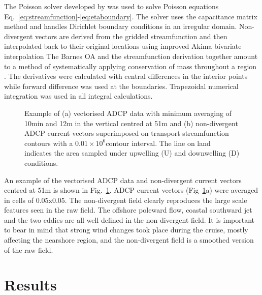 The Poisson solver developed by \citet{Cummins94} was used to
solve Poisson equations
Eq.~\ref{eq:streamfunction}-\ref{eq:etaboundary}. The solver uses
the capacitance matrix method and handles Dirichlet boundary
conditions in an irregular domain. Non-divergent vectors are
derived from the gridded streamfunction and then interpolated back
to their original locations using improved Akima bivariate
interpolation \citep{Akima96} The Barnes OA and the streamfunction
derivation together amount to a method of systematically applying
conservation of mass throughout a region \citep{Pierce00}. The
derivatives were calculated with central differences in the
interior points while forward difference was used at the
boundaries. Trapezoidal numerical integration was used in all
integral calculations.

\begin{figure}[!ht]
\centering {}  \caption{Example of
(a) vectorised ADCP data with minimum averaging of 10min and 12m
in the vertical centred at 51m and (b) non-divergent ADCP current
vectors superimposed on transport streamfunction contours with a
$0.01\times 10^{6}$\tra contour interval. The line on land
indicates the area sampled under upwelling (U) and downwelling (D)
conditions.} \label{fig:cd105_stream}\end{figure}

An example of the vectorised ADCP data and non-divergent current
vectors centred at 51m is shown in Fig.~\ref{fig:cd105_stream}.
ADCP current vectors (Fig~\ref{fig:cd105_stream}a) were averaged
in cells of 0.05x0.05\deg. The non-divergent field clearly
reproduces the large scale features seen in the raw field. The
offshore poleward flow, coastal southward jet and the two eddies
are all well defined in the non-divergent field. It is important
to bear in mind that strong wind changes took place during the
cruise, mostly affecting the nearshore region, and the
non-divergent field is a smoothed version of the raw field.

\section{Results}
